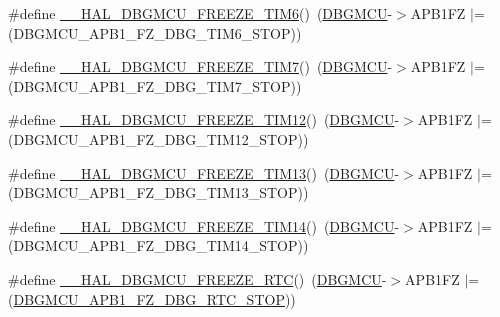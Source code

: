 \begin{DoxyCompactItemize}
\item 
\#define \hyperlink{group___h_a_l___exported___macros_gaccdcfde9ae6f78f0ca359776b021f87c}{\+\_\+\+\_\+\+H\+A\+L\+\_\+\+D\+B\+G\+M\+C\+U\+\_\+\+F\+R\+E\+E\+Z\+E\+\_\+\+T\+I\+M6}()~(\hyperlink{group___peripheral__declaration_ga92ec6d9ec2251fda7d4ce09748cd74b4}{D\+B\+G\+M\+CU}-\/$>$A\+P\+B1\+FZ $\vert$= (D\+B\+G\+M\+C\+U\+\_\+\+A\+P\+B1\+\_\+\+F\+Z\+\_\+\+D\+B\+G\+\_\+\+T\+I\+M6\+\_\+\+S\+T\+OP))
\item 
\#define \hyperlink{group___h_a_l___exported___macros_ga8541da9b4d428d41e218e9701e4307d1}{\+\_\+\+\_\+\+H\+A\+L\+\_\+\+D\+B\+G\+M\+C\+U\+\_\+\+F\+R\+E\+E\+Z\+E\+\_\+\+T\+I\+M7}()~(\hyperlink{group___peripheral__declaration_ga92ec6d9ec2251fda7d4ce09748cd74b4}{D\+B\+G\+M\+CU}-\/$>$A\+P\+B1\+FZ $\vert$= (D\+B\+G\+M\+C\+U\+\_\+\+A\+P\+B1\+\_\+\+F\+Z\+\_\+\+D\+B\+G\+\_\+\+T\+I\+M7\+\_\+\+S\+T\+OP))
\item 
\#define \hyperlink{group___h_a_l___exported___macros_ga2bbe99ec741228b520e17b1bf38eb2ad}{\+\_\+\+\_\+\+H\+A\+L\+\_\+\+D\+B\+G\+M\+C\+U\+\_\+\+F\+R\+E\+E\+Z\+E\+\_\+\+T\+I\+M12}()~(\hyperlink{group___peripheral__declaration_ga92ec6d9ec2251fda7d4ce09748cd74b4}{D\+B\+G\+M\+CU}-\/$>$A\+P\+B1\+FZ $\vert$= (D\+B\+G\+M\+C\+U\+\_\+\+A\+P\+B1\+\_\+\+F\+Z\+\_\+\+D\+B\+G\+\_\+\+T\+I\+M12\+\_\+\+S\+T\+OP))
\item 
\#define \hyperlink{group___h_a_l___exported___macros_ga21bfaea50e429031982861b2869c6863}{\+\_\+\+\_\+\+H\+A\+L\+\_\+\+D\+B\+G\+M\+C\+U\+\_\+\+F\+R\+E\+E\+Z\+E\+\_\+\+T\+I\+M13}()~(\hyperlink{group___peripheral__declaration_ga92ec6d9ec2251fda7d4ce09748cd74b4}{D\+B\+G\+M\+CU}-\/$>$A\+P\+B1\+FZ $\vert$= (D\+B\+G\+M\+C\+U\+\_\+\+A\+P\+B1\+\_\+\+F\+Z\+\_\+\+D\+B\+G\+\_\+\+T\+I\+M13\+\_\+\+S\+T\+OP))
\item 
\#define \hyperlink{group___h_a_l___exported___macros_gaf4d10c15c1644eeff138829af21c219c}{\+\_\+\+\_\+\+H\+A\+L\+\_\+\+D\+B\+G\+M\+C\+U\+\_\+\+F\+R\+E\+E\+Z\+E\+\_\+\+T\+I\+M14}()~(\hyperlink{group___peripheral__declaration_ga92ec6d9ec2251fda7d4ce09748cd74b4}{D\+B\+G\+M\+CU}-\/$>$A\+P\+B1\+FZ $\vert$= (D\+B\+G\+M\+C\+U\+\_\+\+A\+P\+B1\+\_\+\+F\+Z\+\_\+\+D\+B\+G\+\_\+\+T\+I\+M14\+\_\+\+S\+T\+OP))
\item 
\#define \hyperlink{group___h_a_l___exported___macros_ga6ea586c594feb6eb0f2aba52f1c69f4c}{\+\_\+\+\_\+\+H\+A\+L\+\_\+\+D\+B\+G\+M\+C\+U\+\_\+\+F\+R\+E\+E\+Z\+E\+\_\+\+R\+TC}()~(\hyperlink{group___peripheral__declaration_ga92ec6d9ec2251fda7d4ce09748cd74b4}{D\+B\+G\+M\+CU}-\/$>$A\+P\+B1\+FZ $\vert$= (\hyperlink{group___peripheral___registers___bits___definition_ga1e20246d389229ff46006b405bb56b1d}{D\+B\+G\+M\+C\+U\+\_\+\+A\+P\+B1\+\_\+\+F\+Z\+\_\+\+D\+B\+G\+\_\+\+R\+T\+C\+\_\+\+S\+T\+OP}))

\end{DoxyCompactItemize}
